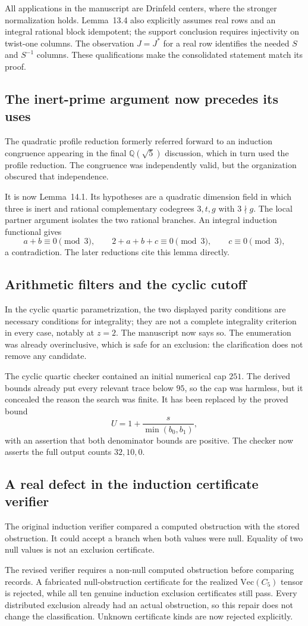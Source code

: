 \documentclass[11pt,a4paper]{article}
\newcommand{\issue}[1]{\subsection{#1}}
\begin{document}
All applications in the manuscript are Drinfeld centers, where the
stronger normalization holds. Lemma~13.4 also explicitly assumes real
rows and an integral rational block idempotent; the support conclusion
requires injectivity on twist-one columns. The observation \(J=J^*\)
for a real row identifies the needed \(S\) and \(S^{-1}\) columns.
These qualifications make the consolidated statement match its proof.

\issue{The inert-prime argument now precedes its uses}

The quadratic profile reduction formerly referred forward to an induction
congruence appearing in the final \(\mathbb Q(\sqrt5)\) discussion, which
in turn used the profile reduction. The congruence was independently
valid, but the organization obscured that independence.

It is now Lemma~14.1. Its hypotheses are a quadratic dimension field in
which three is inert and rational complementary codegrees \(3,t,g\)
with \(3\nmid g\). The local partner argument isolates the two rational
branches. An integral induction functional gives
\[
 a+b\equiv0\pmod3,\qquad 2+a+b+c\equiv0\pmod3,\qquad c\equiv0\pmod3,
\]
a contradiction. The later reductions cite this lemma directly.

\issue{Arithmetic filters and the cyclic cutoff}

In the cyclic quartic parametrization, the two displayed parity conditions
are necessary conditions for integrality; they are not a complete
integrality criterion in every case, notably at \(z=2\). The manuscript
now says so. The enumeration was already overinclusive, which is safe
for an exclusion: the clarification does not remove any candidate.

The cyclic quartic checker contained an initial numerical cap \(251\).
The derived bounds already put every relevant trace below \(95\), so
the cap was harmless, but it concealed the reason the search was finite.
It has been replaced by the proved bound
\[
 U=1+\frac{s}{\min(b_0,b_1)},
\]
with an assertion that both denominator bounds are positive.
The checker now asserts the full output counts \(32,10,0\).

\issue{A real defect in the induction certificate verifier}

The original induction verifier compared a computed obstruction with the
stored obstruction. It could accept a branch when both values were null.
Equality of two null values is not an exclusion certificate.

The revised verifier requires a non-null computed obstruction before
comparing records. A fabricated null-obstruction certificate for the
realized \(\mathrm{Vec}(C_5)\) tensor is rejected, while all ten genuine
induction exclusion certificates still pass. Every distributed exclusion
already had an actual obstruction, so this repair does not change the
classification. Unknown certificate kinds are now rejected explicitly.
\end{document}

